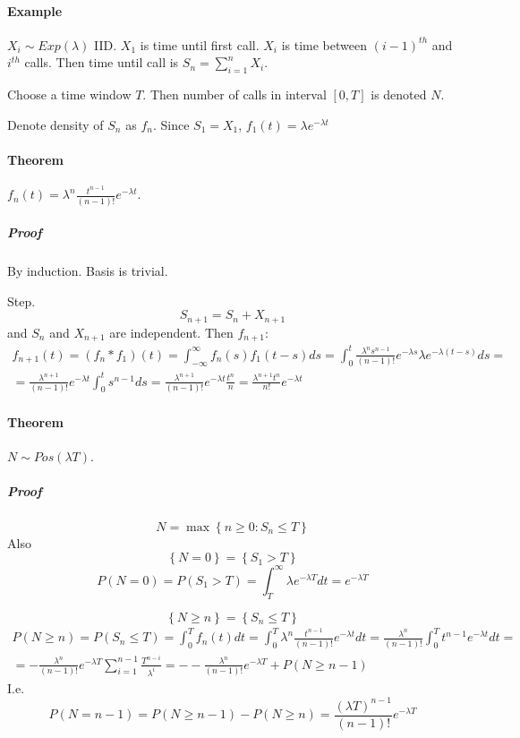 \paragraph{Example}
$X_i \sim Exp(\lambda)$ IID.
$X_1$ is time until first call.  $X_i$ is time between $(i-1)^{th}$ and $i^{th}$ calls. Then time until call is $S_n = \sum_{i=1}^n X_i$.

Choose a time window $T$. Then number of calls in interval $[0,T]$ is denoted $N$.

Denote density of $S_n$ as $f_n$. Since $S_1=X_1$, $f_1(t) = \lambda e^{-\lambda t}$
\paragraph{Theorem} $f_n(t) = \lambda^n \frac{t^{n-1}}{(n-1)!}e^{-\lambda t}$.
\subparagraph{Proof}
By induction. Basis is trivial. 

Step.
$$S_{n+1} = S_n + X_{n+1}$$
and $S_n$ and $X_{n+1}$ are independent. 
Then $f_{n+1}$:
\begin{align*}
f_{n+1}(t) = \left(f_n * f_1\right)(t)= \int_{-\infty}^\infty f_n(s) f_1(t-s) ds = \int_{0}^t \frac{\lambda^n s^{n-1}}{(n-1)!}e^{-\lambda s} \lambda e^{-\lambda (t-s)} ds =\\= \frac{\lambda^{n+1}}{(n-1)!}e^{-\lambda t}\int_{0}^t s^{n-1} ds  = \frac{\lambda^{n+1}}{(n-1)!}e^{-\lambda t}\frac{t^n}{n} = \frac{\lambda^{n+1}t^n}{n!}e^{-\lambda t} 
\end{align*}
\paragraph{Theorem} $N \sim Pos(\lambda T)$.
\subparagraph{Proof}
$$N = \max \left\{ n \geq 0: S_n \leq T \right\}$$
Also
$$\left\{ N=0 \right\} = \left\{ S_1 > T \right\} $$
$$P(N=0) = P(S_1>T) = \int_T^\infty \lambda e^{-\lambda T} dt= e^{-\lambda T}$$

$$\left\{ N \geq n \right\} = \left\{ S_n \leq T \right\}$$
\begin{align*}
P(N\geq n) = P(S_n \leq T) = \int_0^T f_n(t) dt = \int_0^T \lambda^n \frac{t^{n-1}}{(n-1)!}e^{-\lambda t} dt = \frac{\lambda^n}{(n-1)!} \int_0^T  t^{n-1}e^{-\lambda t} dt =\\= - \frac{\lambda^n}{(n-1)!}e^{-\lambda T} \sum_{i=1}^{n-1} \frac{T^{n-i}}{\lambda^i} = -- \frac{\lambda^n}{(n-1)!}e^{-\lambda T} + P(N \geq n-1)
\end{align*}
I.e.
$$P(N=n-1) = P(N \geq n-1 ) - P(N \geq n) = \frac{(\lambda T)^{n-1}}{(n-1)!}e^{-\lambda T} $$
